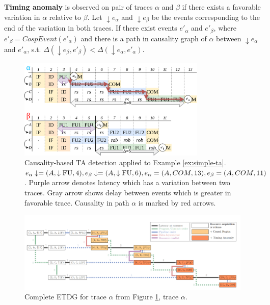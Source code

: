 \textbf{Timing anomaly} is observed on pair of traces $\alpha$ and $\beta$ if there exists a favorable variation in $\alpha$ relative to $\beta$. Let $\downarrow e_\alpha$ and $\downarrow e_\beta$ be the events corresponding to the end of the variation in both traces. If there exist events $e'_\alpha$ and $e'_\beta$, where $e'_\beta = CospEvent(e'_\alpha)$ and there is a path in causality graph of $\alpha$ between $\downarrow e_\alpha$ and $e'_\alpha$, s.t. $\Delta(\downarrow e_\beta,e'_\beta) < \Delta(\downarrow e_\alpha,e'_\alpha)$.



\begin{figure}[htbp]
    \centering
    \includegraphics[width=0.8\textwidth]{figures/multiscalar_ta_causality.png}
    \caption{Causality-based TA detection applied to Example \ref{ex:simple-ta}. $e_\alpha\downarrow = (A, \downarrow\mathrm{FU}, 4), e_\beta\downarrow = (A, \downarrow\mathrm{FU}, 6), e_\alpha = (A, COM, 13), e_\beta = (A, COM, 11)$. Purple arrow denotes latency which has a variation between two traces. Gray arrow shows delay between events which is greater in favorable trace. Causality in  path $\alpha$ is marked by red arrows.}
    \label{fig:multiscalar-ta-causality}
\end{figure}

\begin{figure}[htbp]
    \centering
    \includegraphics[width=\textwidth]{figures/ETDG.png}
    \caption{Complete ETDG for trace $\alpha$ from Figure \ref{fig:multiscalar-ta-causality}, trace $\alpha$. }
    \label{fig:ETDG}
\end{figure}

